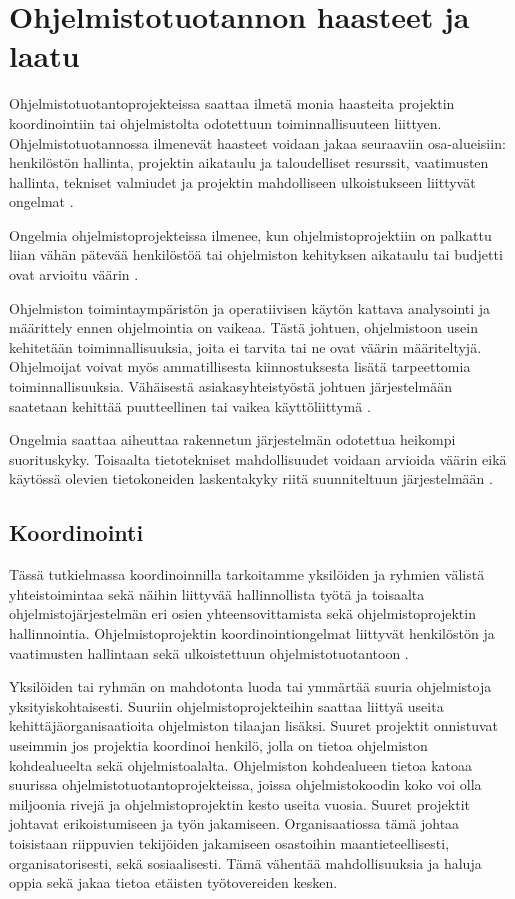 \documentclass[finnish]{tktltiki2}
\theoremstyle{definition}
\theoremstyle{remark}
\begin{document}
\section{Ohjelmistotuotannon haasteet ja laatu}

Ohjelmistotuotantoprojekteissa saattaa ilmetä monia haasteita projektin koordinointiin tai ohjelmistolta odotettuun toiminnallisuuteen liittyen. Ohjelmistotuotannossa ilmenevät haasteet voidaan jakaa seuraaviin osa-alueisiin: henkilöstön hallinta, projektin aikataulu ja taloudelliset resurssit, vaatimusten hallinta, tekniset valmiudet ja projektin mahdolliseen ulkoistukseen liittyvät ongelmat \cite{BOE88}.

Ongelmia  ohjelmistoprojekteissa ilmenee, kun ohjelmistoprojektiin on palkattu liian vähän pätevää henkilöstöä tai ohjelmiston kehityksen aikataulu tai budjetti ovat arvioitu väärin \cite{BOE88}. 

Ohjelmiston toimintaympäristön ja operatiivisen käytön kattava analysointi ja määrittely ennen ohjelmointia on vaikeaa. Tästä johtuen, ohjelmistoon usein kehitetään toiminnallisuuksia, joita ei tarvita tai ne ovat väärin määriteltyjä. Ohjelmoijat voivat myös ammatillisesta kiinnostuksesta lisätä tarpeettomia toiminnallisuuksia. Vähäisestä asiakasyhteistyöstä johtuen järjestelmään saatetaan kehittää puutteellinen tai vaikea käyttöliittymä \cite{BOE88}. 

Ongelmia saattaa aiheuttaa rakennetun järjestelmän odotettua heikompi suorituskyky. Toisaalta tietotekniset mahdollisuudet voidaan arvioida väärin eikä käytössä olevien tietokoneiden laskentakyky riitä suunniteltuun järjestelmään \cite{BOE88}.


\subsection{Koordinointi}

Tässä tutkielmassa koordinoinnilla tarkoitamme yksilöiden ja ryhmien välistä yhteistoimintaa sekä näihin liittyvää hallinnollista työtä ja toisaalta ohjelmistojärjestelmän eri osien yhteensovittamista sekä ohjelmistoprojektin hallinnointia. Ohjelmistoprojektin koordinointiongelmat liittyvät henkilöstön ja vaatimusten hallintaan sekä ulkoistettuun ohjelmistotuotantoon \cite{KES95}. 

Yksilöiden tai ryhmän on mahdotonta luoda tai ymmärtää suuria ohjelmistoja yksityiskohtaisesti. Suuriin ohjelmistoprojekteihin saattaa liittyä useita kehittäjä\-organisaatioita ohjelmiston tilaajan lisäksi. Suuret projektit onnistuvat useimmin jos projektia koordinoi henkilö, jolla on tietoa ohjelmiston kohdealueelta sekä ohjelmistoalalta. Ohjelmiston kohdealueen tietoa katoaa suurissa ohjelmistotuotantoprojekteissa, joissa ohjelmistokoodin koko voi olla miljoonia rivejä ja ohjelmistoprojektin kesto useita vuosia. Suuret projektit johtavat erikoistumiseen ja työn jakamiseen. Organisaatiossa tämä johtaa toisistaan riippuvien tekijöiden jakamiseen osastoihin maantieteellisesti, organisatorisesti, sekä sosiaalisesti. Tämä vähentää mahdollisuuksia ja haluja oppia sekä jakaa tietoa etäisten työtovereiden kesken\cite{KES95}.
\end{document}
